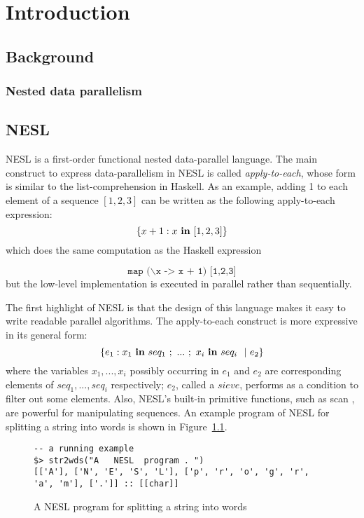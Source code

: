 
\chapter{Introduction}

\section{Background}
\subsection{Nested data parallelism}

\section{NESL}
NESL \cite{blel95nesl} is a first-order functional nested data-parallel language. The main construct to express data-parallelism in NESL is called \emph{apply-to-each}, whose form is similar to the list-comprehension in Haskell. 
As an example, adding 1 to each element of a sequence $[1,2,3]$ can be written as the following apply-to-each expression:
$$ \{x+1 : x \ \mathbf{in} \ [1,2,3] \}$$
which does the same computation as the Haskell expression 

$$\texttt{map ($\backslash$x -> x + 1) [1,2,3]}$$ 
but the low-level implementation is executed in parallel rather than sequentially. 

The first highlight of NESL is that the design of this language makes it easy to write readable parallel algorithms. The apply-to-each construct is more expressive in its general form:
$$ \{ e_1 :  x_1 \ \*{in} \ seq_1 \ ; \ ... \ ; \ x_i \  \*{in} \ seq_i \ \ | \ e_2  \}$$
where the variables $x_1, ...,x_i$ possibly occurring in $e_1$ and $e_2$ are corresponding elements of $seq_1,...,seq_i$ respectively; $e_2$, called a $sieve$, performs as a condition to filter out some elements. 
Also, NESL's built-in primitive functions, such as scan \cite{blel89scan}, are powerful for manipulating sequences.
An example program of NESL for splitting a string into words is shown in Figure~\ref{fig-nesl-wordpart}.

\begin{figure}
 
\begin{lstlisting}[style=nesl-style]
-- a running example
$> str2wds("A   NESL  program . ")
[['A'], ['N', 'E', 'S', 'L'], ['p', 'r', 'o', 'g', 'r', 'a', 'm'], ['.']] :: [[char]]
\end{lstlisting}
\caption{{A NESL program for splitting a string into words \label{fig-nesl-wordpart}}}
\end{figure}

